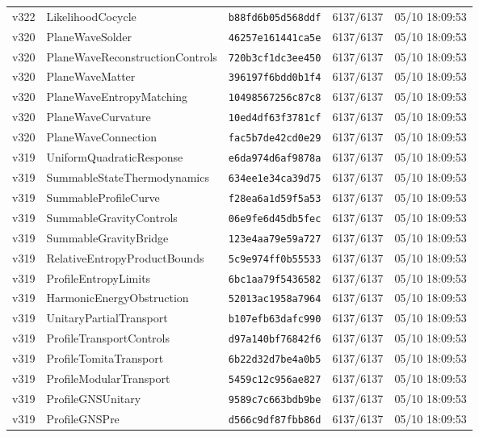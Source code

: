 \documentclass[11pt]{article}
\theoremstyle{definition}\newtheorem{deriv}{Derivation}
\begin{document}
{\begin{longtable}{@{}lllll@{}}
v322 & LikelihoodCocycle & \texttt{b88fd6b05d568ddf} & 6137/6137 & 05/10 18:09:53 \\
v320 & PlaneWaveSolder & \texttt{46257e161441ca5e} & 6137/6137 & 05/10 18:09:53 \\
v320 & PlaneWaveReconstructionControls & \texttt{720b3cf1dc3ee450} & 6137/6137 & 05/10 18:09:53 \\
v320 & PlaneWaveMatter & \texttt{396197f6bdd0b1f4} & 6137/6137 & 05/10 18:09:53 \\
v320 & PlaneWaveEntropyMatching & \texttt{10498567256c87c8} & 6137/6137 & 05/10 18:09:53 \\
v320 & PlaneWaveCurvature & \texttt{10ed4df63f3781cf} & 6137/6137 & 05/10 18:09:53 \\
v320 & PlaneWaveConnection & \texttt{fac5b7de42cd0e29} & 6137/6137 & 05/10 18:09:53 \\
v319 & UniformQuadraticResponse & \texttt{e6da974d6af9878a} & 6137/6137 & 05/10 18:09:53 \\
v319 & SummableStateThermodynamics & \texttt{634ee1e34ca39d75} & 6137/6137 & 05/10 18:09:53 \\
v319 & SummableProfileCurve & \texttt{f28ea6a1d59f5a53} & 6137/6137 & 05/10 18:09:53 \\
v319 & SummableGravityControls & \texttt{06e9fe6d45db5fec} & 6137/6137 & 05/10 18:09:53 \\
v319 & SummableGravityBridge & \texttt{123e4aa79e59a727} & 6137/6137 & 05/10 18:09:53 \\
v319 & RelativeEntropyProductBounds & \texttt{5c9e974ff0b55533} & 6137/6137 & 05/10 18:09:53 \\
v319 & ProfileEntropyLimits & \texttt{6bc1aa79f5436582} & 6137/6137 & 05/10 18:09:53 \\
v319 & HarmonicEnergyObstruction & \texttt{52013ac1958a7964} & 6137/6137 & 05/10 18:09:53 \\
v319 & UnitaryPartialTransport & \texttt{b107efb63dafc990} & 6137/6137 & 05/10 18:09:53 \\
v319 & ProfileTransportControls & \texttt{d97a140bf76842f6} & 6137/6137 & 05/10 18:09:53 \\
v319 & ProfileTomitaTransport & \texttt{6b22d32d7be4a0b5} & 6137/6137 & 05/10 18:09:53 \\
v319 & ProfileModularTransport & \texttt{5459c12c956ae827} & 6137/6137 & 05/10 18:09:53 \\
v319 & ProfileGNSUnitary & \texttt{9589c7c663bdb9be} & 6137/6137 & 05/10 18:09:53 \\
v319 & ProfileGNSPre & \texttt{d566c9df87fbb86d} & 6137/6137 & 05/10 18:09:53 \\

\end{longtable}}
\end{document}
